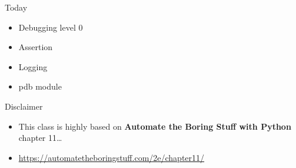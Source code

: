 \documentclass[
  8pt,
  ignorenonframetext,
]{beamer}
\begin{document}
\begin{frame}{Today}
\protect\hypertarget{today}{}
\begin{itemize}
\item
  Debugging level 0
\item
  Assertion
\item
  Logging
\item
  pdb module
\end{itemize}
\end{frame}

\begin{frame}{Disclaimer}
\protect\hypertarget{disclaimer}{}
\begin{itemize}
\item
  This class is highly based on \textbf{Automate the Boring Stuff with
  Python} chapter 11\ldots{}
\item
  \url{https://automatetheboringstuff.com/2e/chapter11/}
\end{itemize}
\end{frame}
\end{document}
